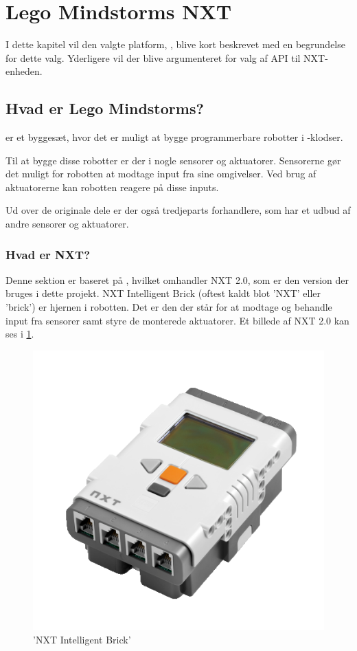 \section{Lego Mindstorms NXT}\label{lego:mindstorms-nxt}
I dette kapitel vil den valgte platform, \legoms, blive kort beskrevet med en begrundelse for dette valg.
Yderligere vil der blive argumenteret for valg af API til NXT-enheden.

\subsection{Hvad er Lego Mindstorms?}
\legoms er et byggesæt, hvor det er muligt at bygge programmerbare robotter i \lego-klodser.

Til at bygge disse robotter er der i \legoms nogle sensorer og aktuatorer. Sensorerne gør det muligt for robotten at modtage input fra sine omgivelser.
Ved brug af aktuatorerne kan robotten reagere på disse inputs.

Ud over de originale \lego dele er der også tredjeparts forhandlere, som har et udbud af andre sensorer og aktuatorer. 

\subsubsection{Hvad er NXT?}
Denne sektion er baseret på \cite{nxt}, hvilket omhandler NXT 2.0, som er den version der bruges i dette projekt.
NXT Intelligent Brick (oftest kaldt blot 'NXT' eller 'brick') er hjernen i \legoms robotten.
Det er den der står for at modtage og behandle input fra sensorer samt styre de monterede aktuatorer.
Et billede af NXT 2.0 kan ses i \cref{platform:nxt}.

\begin{figure}
\begin{center}
\includegraphics[scale=.5]{./graphics/nxt/brick}
\end{center}
\caption{'NXT Intelligent Brick'}
\label{platform:nxt}
\end{figure}

